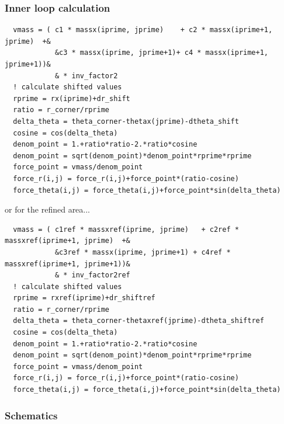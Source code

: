 \documentclass{beamer}
\begin{document}
\begin{frame}[fragile]
 \frametitle{Inner loop calculation}
 \begin{lstlisting}
  vmass = ( c1 * massx(iprime, jprime)    + c2 * massx(iprime+1, jprime)  +&
            &c3 * massx(iprime, jprime+1)+ c4 * massx(iprime+1, jprime+1))&
            & * inv_factor2
  ! calculate shifted values
  rprime = rx(iprime)+dr_shift
  ratio = r_corner/rprime
  delta_theta = theta_corner-thetax(jprime)-dtheta_shift
  cosine = cos(delta_theta)
  denom_point = 1.+ratio*ratio-2.*ratio*cosine
  denom_point = sqrt(denom_point)*denom_point*rprime*rprime
  force_point = vmass/denom_point
  force_r(i,j) = force_r(i,j)+force_point*(ratio-cosine)
  force_theta(i,j) = force_theta(i,j)+force_point*sin(delta_theta)
 \end{lstlisting}
 or for the refined area...
 \begin{lstlisting}
  vmass = ( c1ref * massxref(iprime, jprime)   + c2ref * massxref(iprime+1, jprime)  +&
            &c3ref * massx(iprime, jprime+1) + c4ref * massxref(iprime+1, jprime+1))&
            & * inv_factor2ref
  ! calculate shifted values
  rprime = rxref(iprime)+dr_shiftref
  ratio = r_corner/rprime
  delta_theta = theta_corner-thetaxref(jprime)-dtheta_shiftref
  cosine = cos(delta_theta)
  denom_point = 1.+ratio*ratio-2.*ratio*cosine
  denom_point = sqrt(denom_point)*denom_point*rprime*rprime
  force_point = vmass/denom_point
  force_r(i,j) = force_r(i,j)+force_point*(ratio-cosine)
  force_theta(i,j) = force_theta(i,j)+force_point*sin(delta_theta)
 \end{lstlisting}
\end{frame}
\begin{frame}
 \frametitle{Schematics}
 \begin{figure}[H]
  \centering
 \end{figure}
\end{frame}
\end{document}
